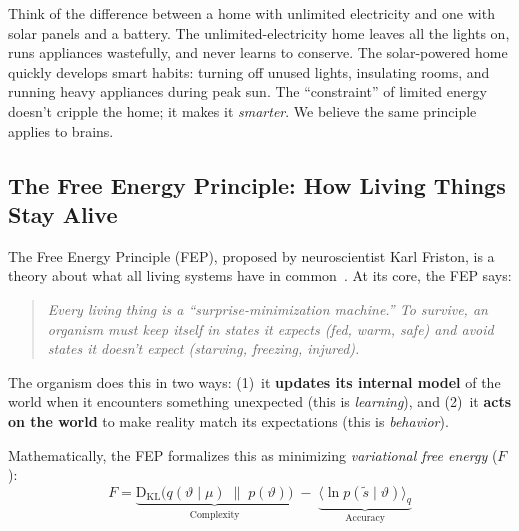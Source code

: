 \documentclass[12pt, a4paper]{article}
\newcommand{\KL}{\mathrm{D_{KL}}}
\begin{document}
\begin{analogybox}
Think of the difference between a home with unlimited electricity and one with solar panels and a battery. The unlimited-electricity home leaves all the lights on, runs appliances wastefully, and never learns to conserve. The solar-powered home quickly develops smart habits: turning off unused lights, insulating rooms, and running heavy appliances during peak sun. The ``constraint'' of limited energy doesn't cripple the home; it makes it \emph{smarter}. We believe the same principle applies to brains.
\end{analogybox}

\subsection{The Free Energy Principle: How Living Things Stay Alive}

The Free Energy Principle (FEP), proposed by neuroscientist Karl Friston, is a theory about what all living systems have in common~\cite{friston2010free, friston2006free}. At its core, the FEP says:

\begin{quote}
\textit{Every living thing is a ``surprise-minimization machine.'' To survive, an organism must keep itself in states it expects (fed, warm, safe) and avoid states it doesn't expect (starving, freezing, injured).}
\end{quote}

The organism does this in two ways: (1)~it \textbf{updates its internal model} of the world when it encounters something unexpected (this is \emph{learning}), and (2)~it \textbf{acts on the world} to make reality match its expectations (this is \emph{behavior}).

Mathematically, the FEP formalizes this as minimizing \emph{variational free energy} ($F$):
\begin{equation}
  F = \underbrace{\KL\!\bigl(q(\vartheta \mid \mu) \;\|\; p(\vartheta)\bigr)}_{\text{Complexity}} \;-\; \underbrace{\bigl\langle \ln p(\tilde{s} \mid \vartheta) \bigr\rangle_q}_{\text{Accuracy}}
  \label{eq:free-energy}
\end{equation}
\end{document}
